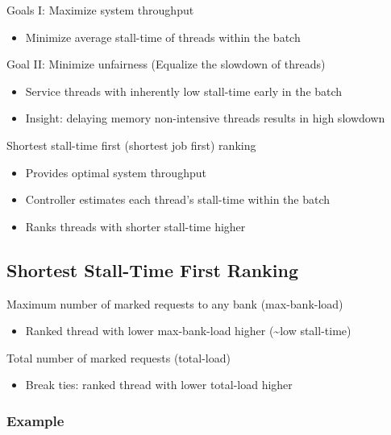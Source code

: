 \documentclass[]{article}
\providecommand{\tightlist}{%
  \setlength{\itemsep}{0pt}\setlength{\parskip}{0pt}}
\begin{document}
Goals I: Maximize system throughput

\begin{itemize}
\tightlist
\item
  Minimize average stall-time of threads within the batch
\end{itemize}

Goal II: Minimize unfairness (Equalize the slowdown of threads)

\begin{itemize}
\tightlist
\item
  Service threads with inherently low stall-time early in the batch
\item
  Insight: delaying memory non-intensive threads results in high
  slowdown
\end{itemize}

Shortest stall-time first (shortest job first) ranking

\begin{itemize}
\tightlist
\item
  Provides optimal system throughput
\item
  Controller estimates each thread's stall-time within the batch
\item
  Ranks threads with shorter stall-time higher
\end{itemize}

\hypertarget{shortest-stall-time-first-ranking}{%
\subsection{Shortest Stall-Time First
Ranking}\label{shortest-stall-time-first-ranking}}

Maximum number of marked requests to any bank (max-bank-load)

\begin{itemize}
\tightlist
\item
  Ranked thread with lower max-bank-load higher (\textasciitilde{}low
  stall-time)
\end{itemize}

Total number of marked requests (total-load)

\begin{itemize}
\tightlist
\item
  Break ties: ranked thread with lower total-load higher
\end{itemize}

\hypertarget{example}{%
\subsubsection{Example}\label{example}}
\end{document}
